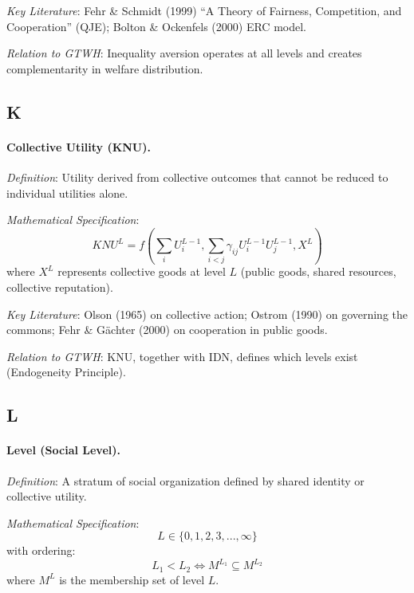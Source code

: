 \documentclass[12pt,a4paper]{article}
\begin{document}
\textit{Key Literature}: Fehr \& Schmidt (1999) ``A Theory of Fairness, Competition, 
and Cooperation'' (QJE); Bolton \& Ockenfels (2000) ERC model.

\textit{Relation to GTWH}: Inequality aversion operates at all levels and creates 
complementarity in welfare distribution.

\subsection*{K}

\paragraph{Collective Utility (KNU).}
\textit{Definition}: Utility derived from collective outcomes that cannot be 
reduced to individual utilities alone.

\textit{Mathematical Specification}:
\begin{equation}
KNU^L = f\left(\sum_i U^{L-1}_i, \sum_{i<j} \gamma_{ij} U^{L-1}_i U^{L-1}_j, X^L\right)
\end{equation}
where $X^L$ represents collective goods at level $L$ (public goods, shared resources, 
collective reputation).

\textit{Key Literature}: Olson (1965) on collective action; Ostrom (1990) on 
governing the commons; Fehr \& Gächter (2000) on cooperation in public goods.

\textit{Relation to GTWH}: KNU, together with IDN, defines which levels exist 
(Endogeneity Principle).

\subsection*{L}

\paragraph{Level (Social Level).}
\textit{Definition}: A stratum of social organization defined by shared identity 
or collective utility.

\textit{Mathematical Specification}:
\begin{equation}
L \in \{0, 1, 2, 3, ..., \infty\}
\end{equation}
with ordering:
\begin{equation}
L_1 < L_2 \iff M^{L_1} \subseteq M^{L_2}
\end{equation}
where $M^L$ is the membership set of level $L$.
\end{document}
